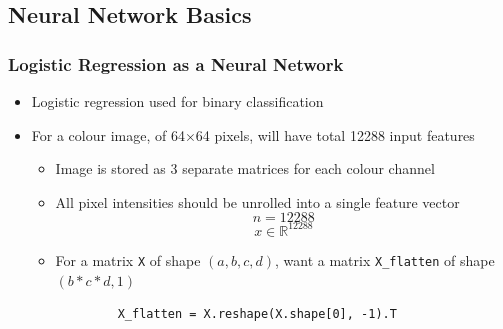 \documentclass[12pt, letterpaper]{article}
\newcommand{\R}{\mathbb{R}}
\begin{document}
    \subsection{Neural Network Basics}
    \subsubsection{Logistic Regression as a Neural Network}
    \begin{itemize}
        \item Logistic regression used for binary classification
        \item For a colour image, of 64$\times$64 pixels, will have total 12288 input features
        \begin{itemize}
            \item Image is stored as 3 separate matrices for each colour channel
            \item All pixel intensities should be unrolled into a single feature vector
            $$n=12288$$
            $$x\in\R^{12288}$$
            \item For a matrix \texttt{X} of shape $(a,b,c,d)$, want a matrix \texttt{X\_flatten} of shape $(b*c*d,1)$
        \end{itemize}
        \begin{verbatim}
            X_flatten = X.reshape(X.shape[0], -1).T
        \end{verbatim}
        
    \end{itemize}
    
\end{document}

